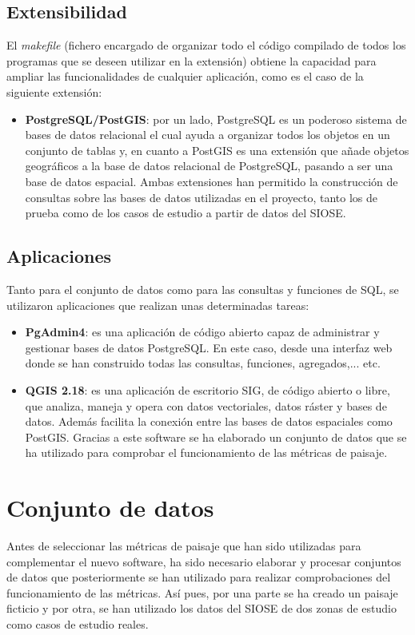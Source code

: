 \subsection{Extensibilidad}
El \textit{makefile} (fichero encargado de organizar todo el código compilado de todos los programas que se deseen utilizar en la extensión) obtiene la capacidad para ampliar las funcionalidades de cualquier aplicación, como es el caso de la siguiente extensión:
\begin{itemize}
\item\textbf{PostgreSQL/PostGIS}: por un lado, PostgreSQL es un poderoso sistema de bases de datos relacional el cual ayuda a organizar todos los objetos en un conjunto de tablas y, en cuanto a PostGIS es una extensión que añade objetos geográficos a la base de datos relacional de PostgreSQL, pasando a ser una base de datos espacial. Ambas extensiones han permitido la construcción de consultas sobre las bases de datos utilizadas en el proyecto, tanto los de prueba como de los casos de estudio a partir de datos del SIOSE.
\end{itemize}

\subsection{Aplicaciones}
Tanto para el conjunto de datos como para las consultas y funciones de SQL, se utilizaron aplicaciones que realizan unas determinadas tareas:
\begin{itemize}
\item\textbf{PgAdmin4}: es una aplicación de código abierto capaz de administrar y gestionar bases de datos PostgreSQL. En este caso, desde una interfaz web donde se han construido todas las consultas, funciones, agregados,... etc.
\item\textbf{QGIS 2.18}: es una aplicación de escritorio SIG, de código abierto o libre, que analiza, maneja y opera con datos vectoriales, datos ráster y bases de datos. Además facilita la conexión entre las bases de datos espaciales como PostGIS. Gracias a este software se ha elaborado un conjunto de datos que se ha utilizado para comprobar el funcionamiento de las métricas de paisaje.
\end{itemize}

\section{Conjunto de datos}
Antes de seleccionar las métricas de paisaje que han sido utilizadas para complementar el nuevo software, ha sido necesario elaborar y procesar conjuntos de datos que posteriormente se han utilizado para realizar comprobaciones del funcionamiento de las métricas. Así pues, por una parte se ha creado un paisaje ficticio y por otra, se han utilizado los datos del SIOSE de dos zonas de estudio como casos de estudio reales.

